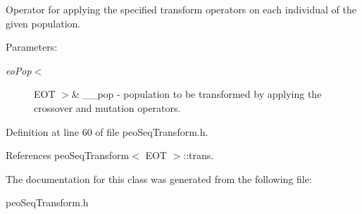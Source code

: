 Operator for applying the specified transform operators on each individual of the given population. 

\begin{Desc}
\item[Parameters:]
\begin{description}
\item[{\em eo\-Pop$<$}]EOT $>$\& \_\-\_\-pop - population to be transformed by applying the crossover and mutation operators. \end{description}
\end{Desc}


Definition at line 60 of file peo\-Seq\-Transform.h.

References peo\-Seq\-Transform$<$ EOT $>$::trans.

The documentation for this class was generated from the following file:\begin{CompactItemize}
\item 
peo\-Seq\-Transform.h\end{CompactItemize}
